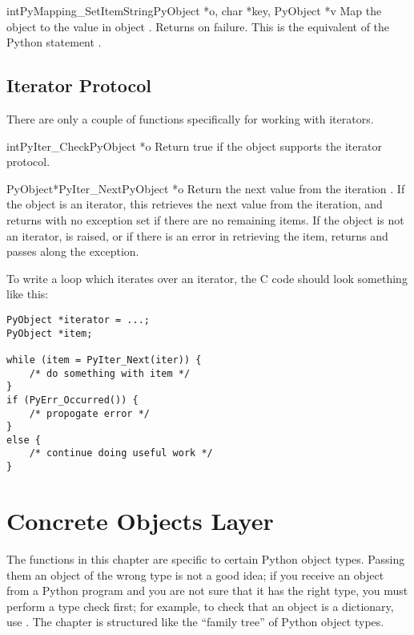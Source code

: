 \documentclass{manual}
\begin{document}
\begin{cfuncdesc}{int}{PyMapping_SetItemString}{PyObject *o, char *key,
                                                PyObject *v}
Map the object  to the value  in object .
Returns  on failure.  This is the equivalent of the Python
statement .
\end{cfuncdesc}


\section{Iterator Protocol \label{iterator}}


There are only a couple of functions specifically for working with
iterators.

\begin{cfuncdesc}{int}{PyIter_Check}{PyObject *o}
  Return true if the object  supports the iterator protocol.
\end{cfuncdesc}

\begin{cfuncdesc}{PyObject*}{PyIter_Next}{PyObject *o}
  Return the next value from the iteration .  If the object is
  an iterator, this retrieves the next value from the iteration, and
  returns \NULL{} with no exception set if there are no remaining
  items.  If the object is not an iterator,  is
  raised, or if there is an error in retrieving the item, returns
  \NULL{} and passes along the exception.
\end{cfuncdesc}

To write a loop which iterates over an iterator, the C code should
look something like this:

\begin{verbatim}
PyObject *iterator = ...;
PyObject *item;

while (item = PyIter_Next(iter)) {
    /* do something with item */
}
if (PyErr_Occurred()) {
    /* propogate error */
}
else {
    /* continue doing useful work */
}
\end{verbatim}


\chapter{Concrete Objects Layer \label{concrete}}

The functions in this chapter are specific to certain Python object
types.  Passing them an object of the wrong type is not a good idea;
if you receive an object from a Python program and you are not sure
that it has the right type, you must perform a type check first;
for example, to check that an object is a dictionary, use
.  The chapter is structured like the
``family tree'' of Python object types.
\end{document}
